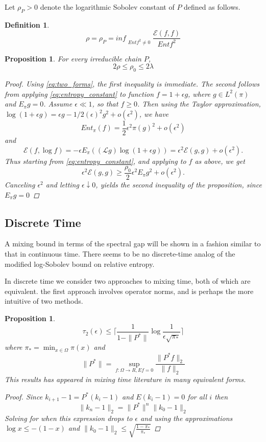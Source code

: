 \documentclass[12pt,reqno]{amsart}
\newtheorem{prop}[thm]{Proposition}
\newtheorem{definition}[thm]{Definition}
{ \theoremstyle{remark}\newtheorem*{remark}{Remark} }
\begin{document}
Let $\rho_P > 0$ denote the logarithmic Sobolev constant of $P$ defined as follows.
\begin{definition}

  $$\displaystyle \rho = \rho_P = {inf}_{\substack{Ent f^2\neq 0}}\frac{\mathcal{E}(f,f)}{Ent f^2}$$

\end{definition}

\begin{prop}
  For every irreducible chain $P$,
$$2\rho \leq \rho_0 \leq 2\lambda$$
  \begin{proof}
    Using \eqref{eq:two_forms}, the first inequality is immediate. The second follows from applying \eqref{eq:entropy_constant} to function $f = 1 + \epsilon g$, where $g\in L^2(\pi)$ and $E_{\pi}g=0$. Assume $\epsilon \ll 1$, so that $f \geq 0$. Then using the Taylor approximation, 
$\log(1+\epsilon g) = \epsilon g - 1/2 (\epsilon)^2g^2+o(\epsilon^2)$, we have 
$$Ent_{\pi}(f) = \frac{1}{2}\epsilon^2\pi(g)^2 + o(\epsilon^2)
$$
and
$$ \mathcal{E}(f,\log f) = -\epsilon E_{\pi}((\mathcal{L}g)\log(1+\epsilon g)) = 
\epsilon^2\mathcal{E}(g,g)+o(\epsilon^2).
$$
Thus starting from \eqref{eq:entropy_constant}, and applying to $f$ as above, we get
$$
\epsilon^2 \mathcal{E}(g,g) \geq \frac{\rho_0}{2}\epsilon^2E_{\pi}g^2+o(\epsilon^2).
$$
Canceling $\epsilon^2$ and letting $\epsilon \downarrow 0$, yields the second inequality of the proposition, since $E_{\pi}g=0$
  \end{proof}
\end{prop}


\subsection{Discrete Time}
A mixing bound in terms of the spectral gap will be shown in a fashion similar to that in
continuous time. There seems to be no discrete-time analog of the modified log-Sobolev bound on relative entropy.

In discrete time we consider two approaches to mixing time, both of which are equivalent. the first approach involves operator norms, and is perhaps the more intuitive of two methods.

\begin{prop}
  \begin{equation}
    \label{eq:discrete_bound}
    \tau_2(\epsilon) \leq \lceil \frac{1}{1-\|P^*\|} \log \frac{1}{\epsilon \sqrt{\pi_*}} \rceil
  \end{equation}
  where $\pi_* = \min_{x\in \Omega}\pi(x)$ and
  $$\|P^*\|= \sup_{f:\Omega \rightarrow R, E f=0}\frac{\|P^*f\|_2}{\|f\|_2}$$
This results has appeared in mixing time literature in many equivalent forms.

  \begin{proof}
  Since $k_{i+1}-1=P^*(k_i-1)$ and $E(k_i - 1)=0$ for all $i$ then
  $$\|k_n-1 \|_2 = \|P^*\|^n\|k_0-1\|_2$$
  Solving for when this expression drops to $\epsilon$ and using the approximations
  $\log x\leq -(1-x)$ and $\|k_0-1\|_2\leq \sqrt{\frac{1-\pi_*}{\pi_*}} $ 
  \end{proof}
\end{prop}
\end{document}
